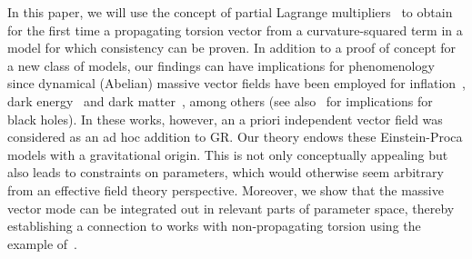 \documentclass[aps,prd,reprint,preprintnumbers,showpacs,floatfix,nofootinbib,superscript address,longbibliography]{revtex4-1}
\begin{document}
In this paper, we will use the concept of partial Lagrange multipliers~\cite{Barker:2022jsh} to obtain for the first time a propagating torsion vector from a curvature-squared term in a model for which consistency can be proven. In addition to a proof of concept for a new class of models, our findings can have implications for phenomenology since dynamical (Abelian) massive vector fields have been employed for inflation~\cite{Ford:1989me,Golovnev:2008cf,Chiba:2008eh,Koivisto:2008xf,Kanno:2008gn,Emami:2016ldl,Rodriguez:2017wkg}, dark energy~\cite{Armendariz-Picon:2004say,Koivisto:2007bp,Koivisto:2008xf,Tasinato:2014eka,DeFelice:2016yws,DeFelice:2016uil,BeltranJimenez:2016afo,deFelice:2017paw,Rodriguez:2017wkg,Nakamura:2018oyy,Heisenberg:2020xak,Benisty:2021sul,deRham:2021efp} and dark matter~\cite{Hambye:2008bq,Hambye:2009fg,Arina:2009uq,Hisano:2010yh,Diaz-Cruz:2010czr,Lebedev:2011iq,Farzan:2012hh,Baek:2012se,Belyaev:2016icc,Arcadi:2020jqf,Barman:2021qds}, among others (see also~\cite{Bekenstein:1971hc,Heisenberg:2017hwb,Garcia-Saenz:2021uyv} for implications for black holes). In these works, however, an a priori independent vector field was considered as an ad hoc addition to GR. Our theory endows these Einstein-Proca models with a gravitational origin. This is not only conceptually appealing but also leads to constraints on parameters, which would otherwise seem arbitrary from an effective field theory perspective. Moreover, we show that the massive vector mode can be integrated out in relevant parts of parameter space, thereby establishing a connection to works with non-propagating torsion using the example of~\cite{Shaposhnikov:2020aen}.
\end{document}
